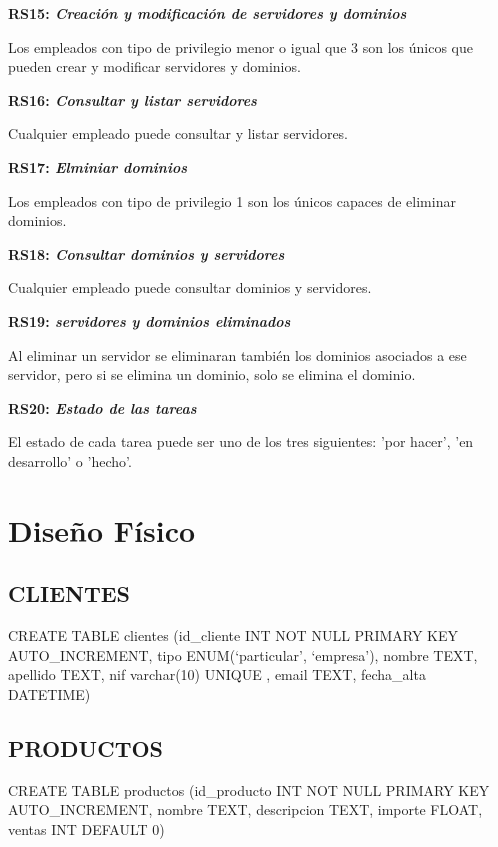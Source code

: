 \documentclass[paper=a4, fontsize=11pt, spanish]{scrartcl}
\begin{document}
\setlength{\parindent}{0em}
\textbf{RS15: \textit{Creación y modificación de servidores y dominios}}
\setlength{\parindent}{2em}

Los empleados con tipo de privilegio menor o igual que 3 son los únicos que pueden crear y modificar servidores y dominios.

\setlength{\parindent}{0em}
\textbf{RS16: \textit{Consultar y listar servidores}}
\setlength{\parindent}{2em}

Cualquier empleado puede consultar y listar servidores.

\setlength{\parindent}{0em}
\textbf{RS17: \textit{Elminiar dominios}}
\setlength{\parindent}{2em}

Los empleados con tipo de privilegio 1 son los únicos capaces de eliminar dominios.

\setlength{\parindent}{0em}
\textbf{RS18: \textit{Consultar dominios y servidores}}
\setlength{\parindent}{2em}

Cualquier empleado puede consultar dominios y servidores.

\setlength{\parindent}{0em}
\textbf{RS19: \textit{servidores y dominios eliminados}}
\setlength{\parindent}{2em}

Al eliminar un servidor se eliminaran también los dominios asociados a ese servidor, pero si se elimina un dominio, solo se elimina el dominio.

\setlength{\parindent}{0em}
\textbf{RS20: \textit{Estado de las tareas}}
\setlength{\parindent}{2em}

El estado de cada tarea puede ser uno de los tres siguientes: 'por hacer', 'en desarrollo' o 'hecho'.

\section{Diseño Físico}
\subsection{CLIENTES}
CREATE TABLE clientes (id\_cliente INT NOT NULL PRIMARY KEY AUTO\_INCREMENT, tipo ENUM(‘particular’, ‘empresa’),  nombre TEXT,  apellido TEXT, nif varchar(10) UNIQUE , email TEXT, fecha\_alta DATETIME)

\subsection{PRODUCTOS}
CREATE TABLE productos (id\_producto INT NOT NULL PRIMARY KEY AUTO\_INCREMENT, nombre TEXT,  descripcion TEXT,  importe FLOAT, ventas INT DEFAULT 0)
\end{document}
